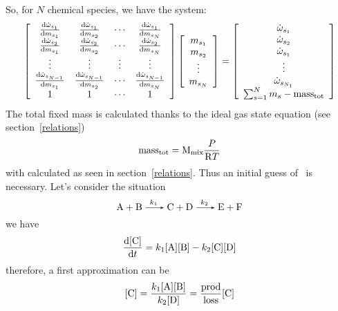 So, for $N$ chemical species, we have the system:
\begin{equation}
\left[\begin{array}{cccc}
\doverdm[s_1]{\mdot[s_1]}     & \doverdm[s_2]{\mdot[s_1]}     & \cdots & \doverdm[s_N]{\mdot[s_1]} \\
\doverdm[s_1]{\mdot[s_2]}     & \doverdm[s_2]{\mdot[s_2]}     & \cdots & \doverdm[s_N]{\mdot[s_2]} \\
\vdots                        & \vdots                        & \vdots & \vdots                    \\
\doverdm[s_1]{\mdot[s_{N-1}]} & \doverdm[s_2]{\mdot[s_{N-1}]} & \cdots & \doverdm[s_N]{\mdot[s_{N-1}]}\\
1                             & 1                             & \cdots & 1\\
\end{array}\right]
\left[\begin{array}{c}
\mass[s_1]\\
\mass[s_2]\\
\vdots\\
\mass[s_N]\\
\end{array}\right]
=
\left[\begin{array}{c}
\mdot[s_1]\\
\mdot[s_2]\\
\mdot[s_1]\\
\vdots\\
\mdot[s_{N_1}]\\
\sum_{s=1}^N\mass[s] - \mathrm{mass_{tot}}
\end{array}\right]
\label{eq:matrixes}
\end{equation}
The total fixed mass is calculated thanks to the ideal gas state equation
(see section~\ref{relations})
\begin{equation}
\mathrm{mass_{tot}} = \Mm[\mathrm{mix}] \frac{P}{\Rg T}
\label{tot_mass}
\end{equation}
with  calculated as seen in section~\ref{relations}.
Thus an initial guess of \massfrac\ is necessary.
Let's consider the situation
\begin{equation}
\ce{A + B ->[k_1] C + D ->[k_2] E + F}
\end{equation}
we have
\begin{equation}
\doverdt{\conc[C]} = k_1\conc[A]\conc[B] - k_2\conc[C]\conc[D]
\end{equation}
therefore, a first approximation can be
\begin{equation}
\conc[C] = \frac{k_1\conc[A]\conc[B]}{k_2\conc[D]} = \frac{\mathrm{prod}}{\mathrm{loss}}\conc[C]
\end{equation}
